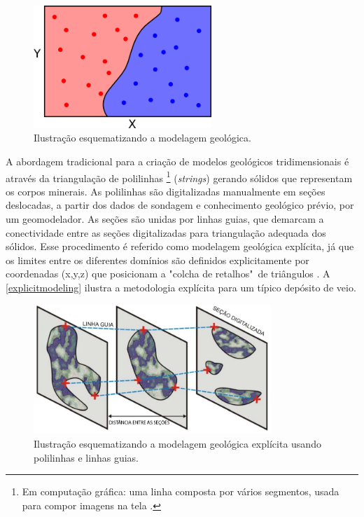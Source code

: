 \begin{figure}[H]
	\centering
	\caption{\label{ilust_mpod}Ilustração esquematizando a modelagem geológica.}
	\includegraphics[width=0.6\textwidth]{capitulo_1/imagens/mapa_geomode_det}
\end{figure}

A abordagem tradicional para a criação de modelos geológicos tridimensionais é através da triangulação de polilinhas \footnote{Em computação gráfica: uma linha composta por vários segmentos, usada para compor imagens na tela \cite{oxfordonlinedictionary}.} (\textit{strings}) gerando sólidos que representam os corpos minerais. As polilinhas são digitalizadas manualmente em seções deslocadas, a partir dos dados de sondagem e conhecimento geológico prévio, por um geomodelador. As seções são unidas por linhas guias, que demarcam a conectividade entre as seções digitalizadas para triangulação adequada dos sólidos. Esse procedimento é referido como modelagem geológica explícita, já que os limites entre os diferentes domínios são definidos explicitamente por coordenadas (x,y,z) que posicionam a "colcha de retalhos"\ de triângulos \cite{mclennan2006boundsim,cowan2003practical}. A \autoref{explicitmodeling} ilustra a metodologia explícita para um típico depósito de veio.

\begin{figure}[H]
    \centering
	\caption{\label{explicitmodeling}Ilustração esquematizando a modelagem geológica explícita usando polilinhas e linhas guias.}
	\includegraphics[width=0.8\textwidth]{capitulo_1/imagens/explicitmodeling}
\end{figure}

